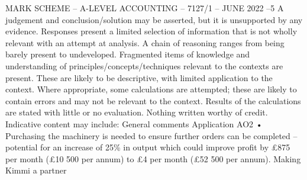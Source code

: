 \documentclass{article}
\begin{document}
MARK SCHEME – A-LEVEL ACCOUNTING – 7127/1 – JUNE 2022   –5 \newline
A judgement and conclusion/solution may be asserted, but it is unsupported by any \newline
evidence. \newline
 \newline
Responses present a limited selection of information that is not wholly relevant with \newline
an attempt at analysis.  A chain of reasoning ranges from being barely present to \newline
undeveloped.  \newline
 \newline
Fragmented items of knowledge and understanding of \newline
principles/concepts/techniques relevant to the contexts are present.  These are likely \newline
to be descriptive, with limited application to the context.  Where appropriate, some \newline
calculations are attempted; these are likely to contain errors and may not be relevant \newline
to the context.  Results of the calculations are stated with little or no evaluation.   \newline
Nothing written worthy of credit. \newline
 \newline
Indicative content may include: \newline
 \newline
General comments \newline
 \newline
Application AO2 \newline
• Purchasing the machinery is needed to ensure further orders can be completed – potential for an \newline
increase of 25\% in output which could improve profit by £875 per month (£10 500 per annum) to £4  per month (£52 500 per annum). \newline
 \newline
  \newline
Making Kimmi a partner \newline
\end{document}

